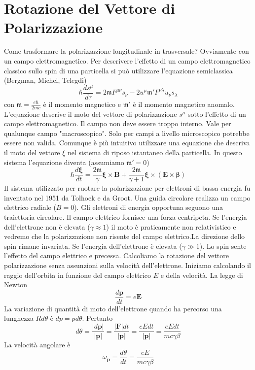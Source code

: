 \section{Rotazione del Vettore di Polarizzazione}
Come trasformare la polarizzazione longitudinale in trasversale? Ovviamente con un campo elettromagnetico. Per descrivere l'effetto di un campo elettromagnetico classico sullo spin di una particella si può utilizzare l'equazione semiclassica (Bergman, Michel, Telegdi)
$$
\hbar \frac{ds^\mu}{d\tau} = 2\mathfrak{m}F^{\mu\nu}s_\nu - 2u^\mu \mathfrak{m}' F^{\nu\lambda}u_\nu s_\lambda
$$
con $\mathfrak{m}=\frac{e\hbar}{2mc}$ è il momento magnetico e $\mathfrak{m}'$ è il momento magnetico anomalo. L'equazione descrive il moto del vettore di polarizzazione $s^\mu$ sotto l'effetto di un campo elettromagnetico. Il campo non deve essere troppo interno. Vale per qualunque campo "macroscopico". Solo per campi a livello microscopico potrebbe essere non valida. Comunque è più intuitivo utilizzare una equazione che descriva il moto del vettore $\xi$ nel sistema di riposo istantaneo della particella. In questo sistema l'equazione diventa (assumiamo $\mathfrak{m}'=0$)
$$
\hbar \frac{d\boldsymbol{\xi}}{dt} = \frac{2\mathfrak{m}}{\gamma} \boldsymbol{\xi} \times \mathbf{B} + \frac{2\mathfrak{m}}{\gamma + 1} \boldsymbol{\xi} \times (\mathbf{E} \times \boldsymbol{\beta})
$$
Il sistema utilizzato per ruotare la polarizzazione per elettroni di bassa energia fu inventato nel 1951 da Tolhoek e da Groot. Una guida circolare realizza un campo elettrico radiale ($B=0$). Gli elettroni di energia opportuna seguono una traiettoria circolare. Il campo elettrico fornisce una forza centripeta. Se l'energia dell'elettrone non è elevata ($\gamma\approx1$) il moto è praticamente non relativistico e vedremo che la polarizzazione non risente del campo elettrico.La direzione dello spin rimane invariata. Se l'energia dell'elettrone è elevata ($\gamma\gg1$). Lo spin sente l'effetto del campo elettrico e precessa. Calcoliamo la rotazione del vettore polarizzazione senza assunzioni sulla velocità dell'elettrone. Iniziamo calcolando il raggio dell'orbita in funzione del campo elettrico $E$ e della velocità. La legge di Newton
$$
\frac{d\mathbf{p}}{dt}=e\mathbf{E}
$$
La variazione di quantità di moto dell'elettrone quando ha percorso una lunghezza $Rd\theta$ è $dp=pd\theta$. Pertanto 
$$
d\theta = \frac{|d\mathbf{p}|}{|\mathbf{p}|} = \frac{|\mathbf{F}|dt}{|\mathbf{p}|} = \frac{eEdt}{|\mathbf{p}|} = \frac{eEdt}{mc\gamma\beta}
$$
La velocità angolare è
$$
\omega_{\mathbf{p}} = \frac{d\theta}{dt} = \frac{eE}{mc\gamma\beta}
$$
